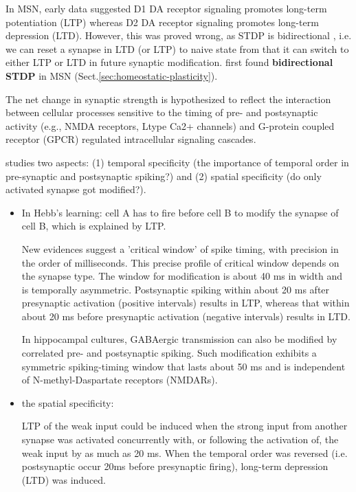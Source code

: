 In MSN, early data suggested D1 DA receptor signaling promotes long-term
potentiation (LTP) whereas D2 DA receptor signaling promotes long-term
depression (LTD). However, this was proved wrong, as STDP is bidirectional
\citep{shen2008}, i.e. we can reset a synapse in LTD (or LTP) to naive state
from that it can switch to either LTP or LTD in future synaptic modification.
\citep{fino2005} first found {\bf bidirectional STDP} in MSN
(Sect.\ref{sec:homeostatic-plasticity}).

The net change in synaptic strength is hypothesized to reflect the interaction
between cellular processes sensitive to the timing of pre- and postsynaptic
activity (e.g., NMDA receptors, Ltype Ca2+ channels) and G-protein coupled
receptor (GPCR) regulated intracellular signaling cascades.



\citep{bi2001} studies two aspects: (1) temporal specificity (the importance
of temporal order in pre-synaptic and postsynaptic spiking?) and (2) spatial
specificity (do only activated synapse got modified?).
\begin{itemize}
  \item In Hebb's learning: cell A has to fire before cell B to modify the
  synapse of cell B, which is explained by LTP.

New evidences suggest a 'critical window' of spike timing, with precision in the
order of milliseconds. This precise profile of critical window depends on the
synapse type. The window for modification is about 40 ms in width and is
temporally asymmetric. Postsynaptic spiking within about 20 ms after presynaptic
activation (positive intervals) results in LTP, whereas that within about 20 ms
before presynaptic activation (negative intervals) results in LTD.

In hippocampal cultures, GABAergic transmission can also be modified by
correlated pre- and postsynaptic spiking. Such modification exhibits a symmetric
spiking-timing window that lasts about 50 ms and is independent of
N-methyl-Daspartate receptors (NMDARs).

  \item the spatial specificity: 

  LTP of the weak input could be induced when the strong input from another
synapse was activated concurrently with, or following the activation of, the
weak input by as much as 20 ms. When the temporal order was reversed (i.e. postsynaptic occur 20ms
before presynaptic firing), long-term depression (LTD) was induced.

\end{itemize}

